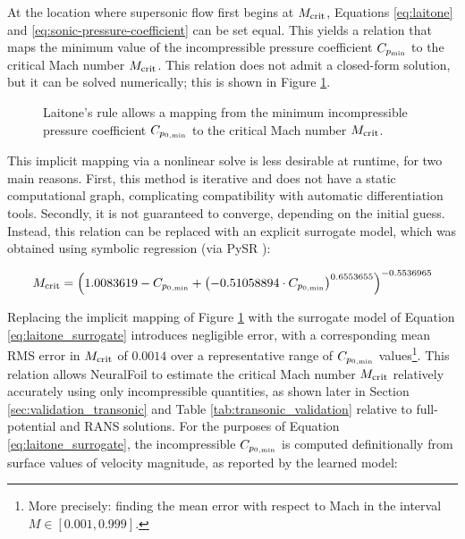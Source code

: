\documentclass[journal]{new-aiaa}
\begin{document}
At the location where supersonic flow first begins at $M_{\rm crit}$, Equations \ref{eq:laitone} and \ref{eq:sonic-pressure-coefficient} can be set equal. This yields a relation that maps the minimum value of the incompressible pressure coefficient $C_{p_{\rm min}}$ to the critical Mach number $M_{\rm crit}$. This relation does not admit a closed-form solution, but it can be solved numerically; this is shown in Figure \ref{fig:compressibility_corrections}.

\begin{figure}[h]
    \centering
    
    \caption{Laitone's rule allows a mapping from the minimum incompressible pressure coefficient $C_{p_{0,\rm min}}$ to the critical Mach number $M_{\rm crit}$.}
    \label{fig:compressibility_corrections}
\end{figure}

This implicit mapping via a nonlinear solve is less desirable at runtime, for two main reasons. First, this method is iterative and does not have a static computational graph, complicating compatibility with automatic differentiation tools. Secondly, it is not guaranteed to converge, depending on the initial guess. Instead, this relation can be replaced with an explicit surrogate model, which was obtained using symbolic regression (via PySR \cite{cranmerInterpretableMachineLearning2023}):

\begin{equation}
    M_{\rm crit} = \left(
    1.0083619
    - C_{p_{0,\rm min}}
    + \left(-0.51058894 \cdot C_{p_{0,\rm min}} \right)^{0.6553655}
    \right)^{-0.5536965}
    \label{eq:laitone_surrogate}
\end{equation}

Replacing the implicit mapping of Figure \ref{fig:compressibility_corrections} with the surrogate model of Equation \ref{eq:laitone_surrogate} introduces negligible error, with a corresponding mean RMS error in $M_{\rm crit}$ of $0.0014$ over a representative range of $C_{p_{0,\rm min}}$ values\footnote{More precisely: finding the mean error with respect to Mach in the interval $M\in[0.001, 0.999]$.}. This relation allows NeuralFoil to estimate the critical Mach number $M_{\rm crit}$ relatively accurately using only incompressible quantities, as shown later in Section \ref{sec:validation_transonic} and Table \ref{tab:transonic_validation} relative to full-potential and RANS solutions. For the purposes of Equation \ref{eq:laitone_surrogate}, the incompressible $C_{p_{0,\rm min}}$ is computed definitionally from surface values of velocity magnitude, as reported by the learned model:
\end{document}
